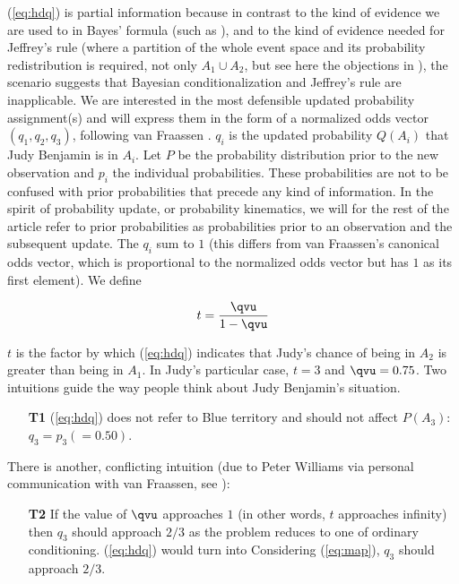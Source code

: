 \documentclass[phd,12pt,oneside]{ubcthesis}
\begin{document}
\nial ({\ref{eq:hdq}}) is partial information because in contrast to
the kind of evidence we are used to in Bayes' formula (such as
), and to the kind of evidence needed
for Jeffrey's rule (where a partition of the whole event space and its
probability redistribution is required, not only $A_{1}\cup{}A_{2}$,
but see here the objections in ), the
scenario suggests that Bayesian conditionalization and Jeffrey's rule
are inapplicable. We are interested in the most defensible updated
probability assignment(s) and will express them in the form of a
normalized odds vector $(q_{1},q_{2},q_{3})$, following van Fraassen
. $q_{i}$ is the updated probability $Q(A_{i})$
that Judy Benjamin is in $A_{i}$. Let $P$ be the probability
distribution prior to the new observation and $p_{i}$ the individual
 probabilities. These probabilities are not to be
confused with prior probabilities that precede any kind of
information. In the spirit of probability update, or probability
kinematics, we will for the rest of the article refer to prior
probabilities as probabilities prior to an observation and the
subsequent update. The $q_{i}$ sum to $1$ (this differs from van
Fraassen's canonical odds vector, which is proportional to the
normalized odds vector but has $1$ as its first element). We define

\begin{equation}
  \label{eq:aengaini}
  t=\frac{{\qvu}}{1-{\qvu}}
\end{equation}

\nial $t$ is the factor by which ({\ref{eq:hdq}}) indicates that
Judy's chance of being in $A_{2}$ is greater than being in $A_{1}$. In
Judy's particular case, $t=3$ and ${\qvu}=0.75$. Two intuitions guide
the way people think about Judy Benjamin's situation.

\begin{enumerate}
  \item[\textbf{T1}] ({\ref{eq:hdq}}) does not refer to Blue territory and
  should not affect $P(A_{3})$: $q_{3}=p_{3}(=0.50)$.
\end{enumerate}

\nial There is another, conflicting intuition (due to Peter Williams
via personal communication with van Fraassen, see
):

\begin{enumerate}
\item[\textbf{T2}] If the value of ${\qvu}$ approaches $1$ (in other words,
  $t$ approaches infinity) then $q_{3}$ should approach $2/3$ as the
  problem reduces to one of ordinary conditioning. ({\ref{eq:hdq}})
  would turn into  Considering
  ({\ref{eq:map}}), $q_{3}$ should approach $2/3$. 
\end{enumerate}
\end{document}
